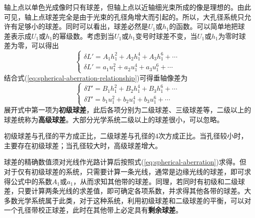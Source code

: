 \documentclass[cn,10pt,chinesefont=founder,math=mtpro2,cite=super,toc=onecol,twoside,openany]{elegantbook}
\begin{document}
轴上点以单色光成像时只有球差，但轴上点以近轴细光束所成的像是理想的。由此可见，轴上点球差完全是由于光束的孔径角增大而引起的。所以，大孔径系统只允许有足够小的球差。同时可以看出，球差必然是$U_1$或$h_1$的函数。可以简单地把球差表示成$U_1$或$h_1$的幂级数。考虑到当$U_1$或$h_1$变号时球差不变，当$U_1$或$h_1$为零时球差为零，可以得出
\begin{equation}
\begin{cases}
\delta L'=A_1h^2_1+A_2h^4_1+A_3h^6_1+\cdots\\
\delta L'=a_1u^2_1+a_2u^4_1+a_3u^6_1+\cdots
\end{cases}
\end{equation}
结合式(\ref{eq:spherical-aberration-relationship})可得垂轴像差为
\begin{equation}
\begin{cases}
\delta T'=B_1h^2_1+B_2h^4_1+B_3h^6_1+\cdots\\
\delta T'=b_1u^2_1+b_2u^4_1+b_3u^6_1+\cdots
\end{cases}
\end{equation}
展开式中第一项为\textbf{初级球差}，此后各项分别为二级球差、三级球差等，二级以上的球差统称为\textbf{高级球差}。大部分光学系统二级以上的球差很小，可以忽略。
\begin{property}
	初级球差与孔径的平方成正比，二级球差与孔径的$4$次方成正比。当孔径较小时，主要存在初级球差；当孔径较大时，高级球差增大。	
\end{property}

球差的精确数值须对光线作光路计算后按照式(\ref{eq:spherical-aberration})求得。但对于仅有初级球差的系统，只需要计算一条光线，通常是边缘光线的球差，即可求得公式中的系数$A_1$或$a_1$，从而求知其他带的球差。同理，若同时有初级和二级球差，只要计算两条光线的求差值，即可确定各项系数，并求得其他各带的球差。大多数光学系统属于此类，对于这种系统，利用初级球差和二级球差的平衡，可以对一个孔径带校正球差，此时在其他带上必定具有\textbf{剩余球差}。
\end{document}
